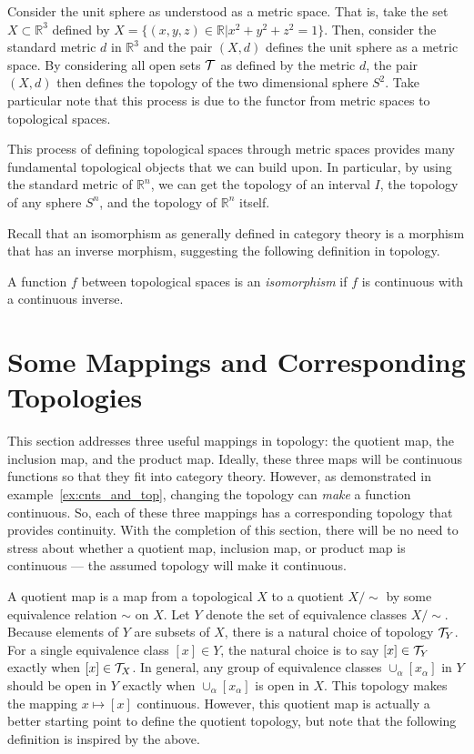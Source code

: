 \documentclass[../sean_thesis.tex]{subfiles}
\begin{document}
\begin{example}[$S^2$]
	Consider the unit sphere as understood as a metric space. That is, take the set $X \subset \mathbb{R}^3$ defined by $X = \{ (x,y,z) \in \mathbb{R} \vert x^2+y^2+z^2 = 1\}$. Then, consider the standard metric $d$ in $\mathbb{R}^3$ and the pair $(X,d)$ defines the unit sphere as a metric space. By considering all open sets $\mathcal{T}$ as defined by the metric $d$, the pair $(X,d)$ then defines the topology of the two dimensional sphere $S^2$. Take particular note that this process is due to the functor from metric spaces to topological spaces.
\end{example}

This process of defining topological spaces through metric spaces provides many fundamental topological objects that we can build upon. In particular, by using the standard metric of $\mathbb{R}^n$, we can get the topology of an interval $I$, the topology of any sphere $S^n$, and the topology of $\mathbb{R}^n$ itself.

Recall that an isomorphism as generally defined in category theory is a morphism that has an inverse morphism, suggesting the following definition in topology.

\begin{definition}[Isomorphism]
	A function $f$ between topological spaces is an \emph{isomorphism} if $f$ is continuous with a continuous inverse.
\end{definition}


\section{Some Mappings and Corresponding Topologies}
This section addresses three useful mappings in topology: the quotient map, the inclusion map, and the product map. Ideally, these three maps will be continuous functions so that they fit into category theory. However, as demonstrated in example~\ref{ex:cnts_and_top}, changing the topology can \emph{make} a function continuous. So, each of these three mappings has a corresponding topology that provides continuity. With the completion of this section, there will be no need to stress about whether a quotient map, inclusion map, or product map is continuous --- the assumed topology will make it continuous.

A quotient map is a map from a topological $X$ to a quotient $X/\sim$ by some equivalence relation $\sim$ on $X$. Let $Y$ denote the set of equivalence classes $X/\sim$. Because elements of $Y$ are subsets of $X$, there is a natural choice of topology $\mathcal{T}_Y$. For a single equivalence class $[x] \in Y$, the natural choice is to say $[x] \in \mathcal{T}_Y$ exactly when $[x] \in \mathcal{T}_X$. In general, any group of equivalence classes $\cup_\alpha [x_\alpha]$ in $Y$ should be open in $Y$ exactly when $\cup_\alpha [x_\alpha]$ is open in $X$. This topology makes the mapping $x \mapsto [x]$ continuous. However, this quotient map is actually a better starting point to define the quotient topology, but note that the following definition is inspired by the above.
\end{document}
